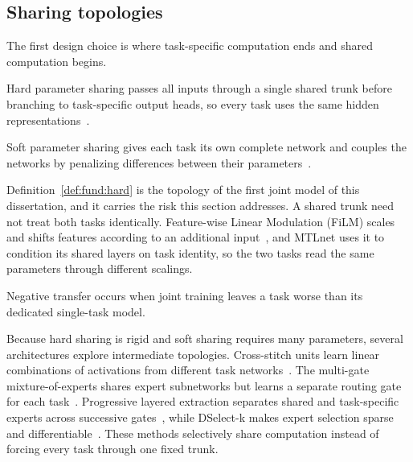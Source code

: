 \subsection{Sharing topologies}

The first design choice is where task-specific computation ends and shared
computation begins.

\begin{definition}\label{def:fund:hard}
    Hard parameter sharing passes all inputs through a single shared trunk before
    branching to task-specific output heads, so every task uses the same hidden
    representations~\cite{ruder2017mtloverview}.
\end{definition}

\begin{definition}\label{def:fund:soft}
    Soft parameter sharing gives each task its own complete network and couples the
    networks by penalizing differences between their
    parameters~\cite{ruder2017mtloverview}.
\end{definition}

Definition~\ref{def:fund:hard} is the topology of the first joint model of this
dissertation, and it carries the risk this section addresses. A shared trunk need not
treat both tasks identically. Feature-wise Linear Modulation (FiLM) scales and shifts
features according to an additional input~\cite{perez2018film}, and MTLnet uses it to
condition its shared layers on task identity, so the two tasks read the same
parameters through different scalings.

\begin{definition}\label{def:fund:negtransfer}
    Negative transfer occurs when joint training leaves a task worse than its dedicated
    single-task model.
\end{definition}

Because hard sharing is rigid and soft sharing requires many parameters, several
architectures explore intermediate topologies. Cross-stitch units learn linear
combinations of activations from different task networks~\cite{misra2016cross}.
The multi-gate mixture-of-experts shares expert subnetworks but learns a
separate routing gate for each task~\cite{ma2018mmoe}. Progressive layered
extraction separates shared and task-specific experts across successive
gates~\cite{tang2020ple}, while DSelect-k makes expert selection sparse and
differentiable~\cite{hazimeh2021dselectk}. These methods selectively share
computation instead of forcing every task through one fixed trunk.

